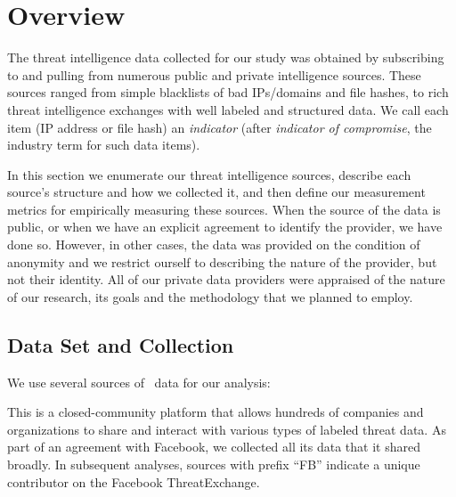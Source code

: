 \section{Overview}
\label{sec:overview}

The threat intelligence data collected for our study was obtained by
subscribing to and pulling from numerous public and private intelligence sources.
These sources ranged from simple blacklists of bad IPs/domains and file hashes,
to rich threat intelligence exchanges with well labeled and structured data.
We call each item (\eg IP address or file hash) an \emph{indicator}
(after \emph{indicator of compromise}, the industry term for such data items).

In this section we enumerate our threat intelligence sources, describe
each source's structure and how we collected it, and then define our
measurement metrics for empirically measuring these sources.  When the
source of the data is public, or when we have an explicit agreement to
identify the provider, we have done so.  However, in other cases, the
data was provided on the condition of anonymity and we restrict
ourself to describing the nature of the provider, but not their
identity.  All of our private data providers were appraised of the
nature of our research, its goals and the methodology that we planned
to employ.



\subsection{Data Set and Collection}

%

We use several sources of \ti\ data for our analysis:

    This is a closed-community platform that allows hundreds of companies and
    organizations to share and interact with various types of labeled threat data.
    As part of an agreement with Facebook, we collected all its data that it shared broadly.
    In subsequent analyses, sources with
    prefix ``FB'' indicate a unique contributor on the Facebook ThreatExchange.

